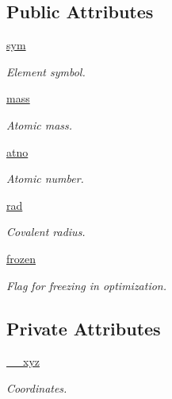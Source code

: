 \subsection*{Public Attributes}
\begin{DoxyCompactItemize}
\item 
\hyperlink{classmolSimplify_1_1Classes_1_1atom3D_1_1atom3D_a9cd296cf59ff02dafe441c19405aff22}{sym}
\begin{DoxyCompactList}\small\item\em Element symbol. \end{DoxyCompactList}\item 
\hyperlink{classmolSimplify_1_1Classes_1_1atom3D_1_1atom3D_a6282b16bd4ac3580dc0c59d080c74b0b}{mass}
\begin{DoxyCompactList}\small\item\em Atomic mass. \end{DoxyCompactList}\item 
\hyperlink{classmolSimplify_1_1Classes_1_1atom3D_1_1atom3D_afb4d6b8a1ed85967dcbe2c2f6e22de02}{atno}
\begin{DoxyCompactList}\small\item\em Atomic number. \end{DoxyCompactList}\item 
\hyperlink{classmolSimplify_1_1Classes_1_1atom3D_1_1atom3D_a4dd6a71e263f8cf93a928295451d1959}{rad}
\begin{DoxyCompactList}\small\item\em Covalent radius. \end{DoxyCompactList}\item 
\hyperlink{classmolSimplify_1_1Classes_1_1atom3D_1_1atom3D_a90f40a8ff8075e053e123ebb8b7003dc}{frozen}
\begin{DoxyCompactList}\small\item\em Flag for freezing in optimization. \end{DoxyCompactList}\end{DoxyCompactItemize}
\subsection*{Private Attributes}
\begin{DoxyCompactItemize}
\item 
\hyperlink{classmolSimplify_1_1Classes_1_1atom3D_1_1atom3D_a974de7acd7e305b90c376ca5199b37d6}{\+\_\+\+\_\+xyz}
\begin{DoxyCompactList}\small\item\em Coordinates. \end{DoxyCompactList}\end{DoxyCompactItemize}


